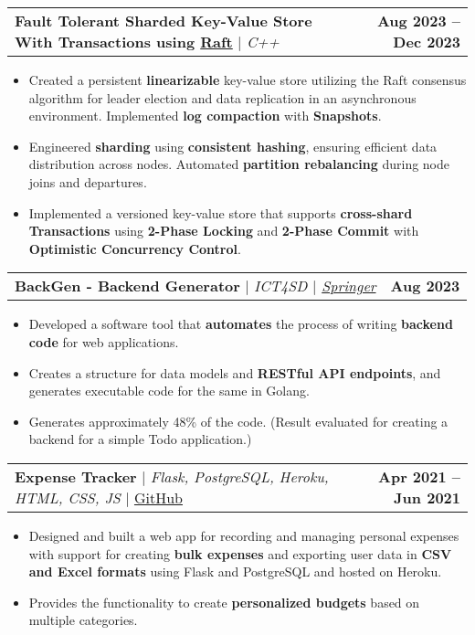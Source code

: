 \documentclass[letterpaper,11pt]{article}
\makeatletter
\newcommand{\resumeItem}[1]{
  \item\small{
    {#1 \vspace{-2pt}}
  }
}
\newcommand{\resumeProjectHeading}[2]{
    \item
    \begin{tabular*}{1.001\textwidth}{l@{\extracolsep{\fill}}r}
      \small#1 & \textbf{\small #2}\\
    \end{tabular*}\vspace{-7pt}
}
\newcommand{\resumeItemListStart}{\begin{itemize}}
\newcommand{\resumeItemListEnd}{\end{itemize}\vspace{-5pt}}
\makeatother
\begin{document}
        \resumeProjectHeading
            {\textbf{\normalsize{Fault Tolerant Sharded Key-Value Store With Transactions using \href{https://raft.github.io/raft.pdf}{Raft}}} $|$ \emph{C++}}{Aug 2023 -- Dec 2023}
            \resumeItemListStart
                \resumeItem{Created a persistent \textbf{linearizable} key-value store utilizing the Raft consensus algorithm for leader election and data replication in an asynchronous environment. Implemented \textbf{log compaction} with \textbf{Snapshots}.}
                \resumeItem{Engineered \textbf{sharding} using \textbf{consistent hashing}, ensuring efficient data distribution across nodes. Automated \textbf{partition rebalancing} during node joins and departures.}
                \resumeItem{Implemented a versioned key-value store that supports \textbf{cross-shard Transactions} using \textbf{2-Phase Locking} and \textbf{2-Phase Commit} with \textbf{Optimistic Concurrency Control}.}
            \resumeItemListEnd
        \vspace{-17pt}

        \resumeProjectHeading
            {\textbf{\normalsize{BackGen - Backend Generator}} $|$ \emph{ICT4SD $|$ \href{https://link.springer.com/chapter/10.1007/978-981-99-6568-7_34}{Springer}}}{Aug 2023}
            \resumeItemListStart
                \resumeItem{Developed a software tool that \textbf{automates} the process of writing \textbf{backend code} for web applications.}
                \resumeItem{Creates a structure for data models and \textbf{RESTful API endpoints}, and generates executable code for the same in Golang.}
                \resumeItem{Generates approximately 48\% of the code. (Result evaluated for creating a backend for a simple Todo application.)}
            \resumeItemListEnd
        \vspace{-17pt}


        \resumeProjectHeading
            {\textbf{\normalsize{Expense Tracker}} $|$ \emph{Flask, PostgreSQL, Heroku, HTML, CSS, JS} $|$ \href{https://github.com/PranavDani/Expense-Tracker}{GitHub}}{Apr 2021 -- Jun 2021}
            \resumeItemListStart
                \resumeItem{Designed and built a web app for recording and managing personal expenses with support for creating \textbf{bulk expenses} and exporting user data in \textbf{CSV and Excel formats} using Flask and PostgreSQL and hosted on Heroku.}
                \resumeItem{Provides the functionality to create \textbf{personalized budgets} based on multiple categories.}
            \resumeItemListEnd       
        
\end{document}
